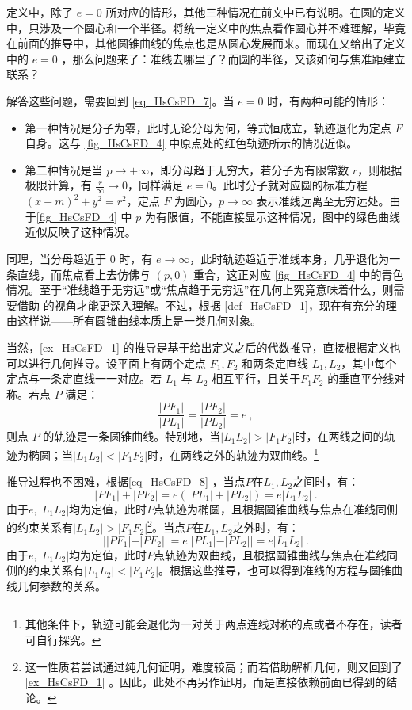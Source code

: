 定义中，除了 $e = 0$ 所对应的情形，其他三种情况在前文中已有说明。在圆的定义中，只涉及一个圆心和一个半径。将统一定义中的焦点看作圆心并不难理解，毕竟在前面的推导中，其他圆锥曲线的焦点也是从圆心发展而来。而现在又给出了定义中的 $e = 0$ ，那么问题来了：准线去哪里了？而圆的半径，又该如何与焦准距建立联系？

解答这些问题，需要回到 \autoref{eq_HsCsFD_7}。当 $e = 0$ 时，有两种可能的情形：
\begin{itemize}
\item 第一种情况是分子为零，此时无论分母为何，等式恒成立，轨迹退化为定点 $F$ 自身。这与 \autoref{fig_HsCsFD_4} 中原点处的红色轨迹所示的情况近似。
\item 第二种情况是当 $p \to +\infty$，即分母趋于无穷大，若分子为有限常数 $r$，则根据极限计算，有 $\displaystyle\frac{r}{\infty} \to 0$，同样满足 $e = 0$。此时分子就对应圆的标准方程 $(x - m)^2 + y^2 = r^2$，定点 $F$ 为圆心，$p \to \infty$ 表示准线远离至无穷远处。由于\autoref{fig_HsCsFD_4} 中 $p$ 为有限值，不能直接显示这种情况，图中的绿色曲线近似反映了这种情况。
\end{itemize}

同理，当分母趋近于 $0$ 时，有 $e \to \infty$，此时轨迹趋近于准线本身，几乎退化为一条直线，而焦点看上去仿佛与 $(p, 0)$ 重合，这正对应 \autoref{fig_HsCsFD_4} 中的青色情况。至于“准线趋于无穷远”或“焦点趋于无穷远”在几何上究竟意味着什么，则需要借助  的视角才能更深入理解。不过，根据 \autoref{def_HsCsFD_1}，现在有充分的理由这样说——所有圆锥曲线本质上是一类几何对象。

当然，\autoref{ex_HsCsFD_1} 的推导是基于给出定义之后的代数推导，直接根据定义也可以进行几何推导。设平面上有两个定点 $F_1, F_2$ 和两条定直线 $L_1, L_2$，其中每个定点与一条定直线一一对应。若 $L_1$ 与 $L_2$ 相互平行，且关于$F_1F_2$ 的垂直平分线对称。若点 $P$ 满足：
\begin{equation}\label{eq_HsCsFD_8}
\frac{|PF_1|}{|PL_1|} = \frac{|PF_2|}{|PL_2|} = e~,
\end{equation}
则点 $P$ 的轨迹是一条圆锥曲线。特别地，当$|L_1L_2|>|F_1F_2|$时，在两线之间的轨迹为椭圆；当$|L_1L_2|<|F_1F_2|$时，在两线之外的轨迹为双曲线。\footnote{其他条件下，轨迹可能会退化为一对关于两点连线对称的点或者不存在，读者可自行探究。}

推导过程也不困难，根据\autoref{eq_HsCsFD_8} ，当点$P$在$L_1,L_2$之间时，有：
\begin{equation}
|PF_1|+|PF_2|=e(|PL_1|+|PL_2|)=e|L_1L_2|~.
\end{equation}
由于$e,|L_1L_2|$均为定值，此时$P$点轨迹为椭圆，且根据圆锥曲线与焦点在准线同侧的约束关系有$|L_1L_2|>|F_1F_2|$\footnote{这一性质若尝试通过纯几何证明，难度较高；而若借助解析几何，则又回到了\autoref{ex_HsCsFD_1} 。因此，此处不再另作证明，而是直接依赖前面已得到的结论。}。当点$P$在$L_1,L_2$之外时，有：
\begin{equation}
||PF_1|-|PF_2||=e||PL_1|-|PL_2||=e|L_1L_2|~.
\end{equation}
由于$e,|L_1L_2|$均为定值，此时$P$点轨迹为双曲线，且根据圆锥曲线与焦点在准线同侧的约束关系有$|L_1L_2|<|F_1F_2|$。根据这些推导，也可以得到准线的方程与圆锥曲线几何参数的关系。

